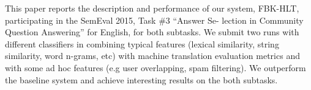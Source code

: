 This paper reports the description and performance of our system, FBK-HLT, participating in the SemEval 2015, Task \#3 ``Answer Se- lection in Community Question Answering'' for English, for both subtasks. We submit two runs with different classifiers in combining typical features (lexical similarity, string similarity, word n-grams, etc) with machine translation evaluation metrics and with some ad hoc features (e.g user overlapping, spam filtering). We outperform the baseline system and achieve interesting results on the both subtasks.
